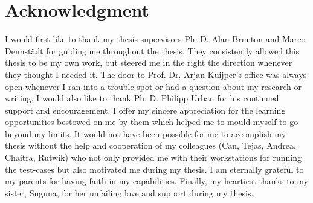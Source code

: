\documentclass[type=msc,colorback,accentcolor=tud1d,bigchapter]{tudthesis}
\begin{document}
\chapter*{Acknowledgment}
I would first like to thank my thesis supervisors Ph. D. Alan Brunton and Marco Dennst{\"a}dt for guiding me throughout the thesis. They consistently allowed this thesis to be my own work, but steered me in the right the direction whenever they thought I needed it. The door to Prof. Dr. Arjan Kuijper's office was always open whenever I ran into a trouble spot or had a question about my research or writing. I would also like to thank Ph. D. Philipp Urban for his continued support and encouragement. I offer my sincere appreciation for the learning opportunities bestowed on me by them which helped me to mould myself to go beyond my limits. It would not have been possible for me to accomplish my thesis without the help and cooperation of my colleagues (Can, Tejas, Andrea, Chaitra, Rutwik) who not only provided me with their workstations for running the test-cases but also motivated me during my thesis. I am eternally grateful to my parents for having faith in my capabilities. Finally, my heartiest thanks to my sister, Suguna, for her unfailing love and support during my thesis. 
\newpage

\tableofcontents
\newpage
\listoffigures
\newpage
\lstlistoflistings
\newpage
\listoftables
\newpage


\newpage

\newpage

\newpage

\newpage

\newpage

\newpage

\newpage

\newpage
\printbibliography
\end{document}
